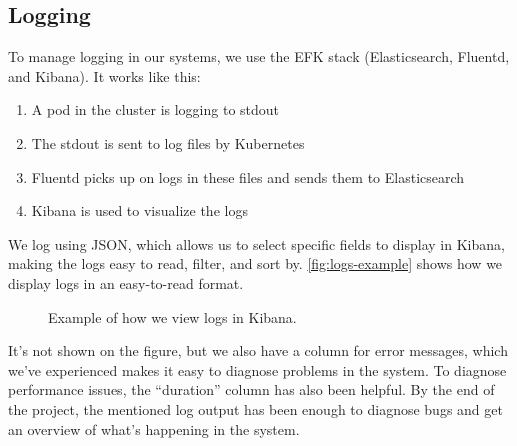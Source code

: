 \subsection{Logging}
To manage logging in our systems, we use the EFK stack (Elasticsearch, Fluentd, and Kibana). It works like this:
\begin{enumerate}
  \item A pod in the cluster is logging to stdout
  \item The stdout is sent to log files by Kubernetes
  \item Fluentd picks up on logs in these files and sends them to Elasticsearch
  \item Kibana is used to visualize the logs
\end{enumerate}
We log using JSON, which allows us to select specific fields to display in Kibana, making the logs easy to read, filter, and sort by. \autoref{fig:logs-example} shows how we display logs in an easy-to-read format.
\begin{figure}[H]
  \caption{Example of how we view logs in Kibana.}
  \label{fig:logs-example}
\end{figure}
It's not shown on the figure, but we also have a column for error messages, which we've experienced makes it easy to diagnose problems in the system. To diagnose performance issues, the ``duration'' column has also been helpful. By the end of the project, the mentioned log output has been enough to diagnose bugs and get an overview of what's happening in the system.
